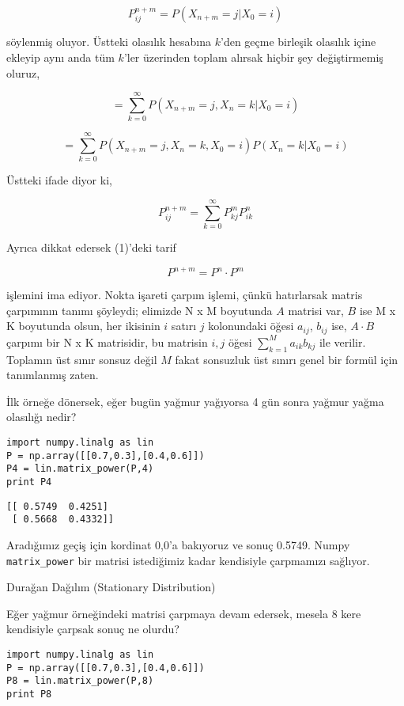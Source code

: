 \documentclass[12pt,fleqn]{article}\usepackage{../../common}
\begin{document}
$$
P_{ij}^{n+m} = P(X_{n+m} = j | X_0 = i )
$$

söylenmiş oluyor. Üstteki olasılık hesabına $k$'den geçme birleşik olasılık
içine ekleyip aynı anda tüm $k$'ler üzerinden toplam alırsak hiçbir şey
değiştirmemiş oluruz,

$$
= \sum_{k=0}^{\infty} P(X_{n+m} = j, X_n = k | X_0 = i )
$$

$$
= \sum_{k=0}^{\infty} P(X_{n+m} = j, X_n = k, X_0 = i )
P(X_n=k|X_0=i)
$$

Üstteki ifade diyor ki,

$$
P_{ij}^{n+m} = \sum _{k=0}^{\infty} P_{kj}^m P_{ik}^n 
$$

Ayrıca dikkat edersek (1)'deki tarif

$$
P^{n+m} = P^n \cdot P^m
$$

işlemini ima ediyor. Nokta işareti çarpım işlemi, çünkü hatırlarsak matris
çarpımının tanımı şöyleydi; elimizde N x M boyutunda $A$ matrisi var, $B$ ise M
x K boyutunda olsun, her ikisinin $i$ satırı $j$ kolonundaki öğesi $a_{ij}$,
$b_{ij}$ ise, $A \cdot B$ çarpımı bir N x K matrisidir, bu matrisin $i,j$ öğesi
$\sum_{k=1}^{M} a_{ik}b_{kj}$ ile verilir. Toplamın üst sınır sonsuz değil
$M$ fakat sonsuzluk üst sınırı genel bir formül için tanımlanmış zaten.


İlk örneğe dönersek, eğer bugün yağmur yağıyorsa 4 gün sonra yağmur yağma
olasılığı nedir?

\begin{verbatim}
import numpy.linalg as lin
P = np.array([[0.7,0.3],[0.4,0.6]])
P4 = lin.matrix_power(P,4)
print P4
\end{verbatim}

\begin{verbatim}
[[ 0.5749  0.4251]
 [ 0.5668  0.4332]]
\end{verbatim}

Aradığımız geçiş için kordinat 0,0'a bakıyoruz ve sonuç 0.5749. Numpy
\verb!matrix_power! bir matrisi istediğimiz kadar kendisiyle çarpmamızı
sağlıyor. 

Durağan Dağılım (Stationary Distribution)

Eğer yağmur örneğindeki matrisi çarpmaya devam edersek, mesela 8 kere
kendisiyle çarpsak sonuç ne olurdu? 

\begin{verbatim}
import numpy.linalg as lin
P = np.array([[0.7,0.3],[0.4,0.6]])
P8 = lin.matrix_power(P,8)
print P8
\end{verbatim}
\end{document}
